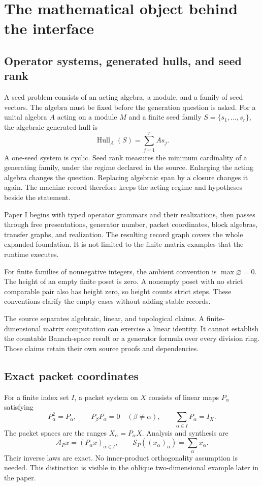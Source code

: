 \documentclass[a4paper,11pt]{article}
\newcommand{\Hull}{\operatorname{Hull}}\newcommand{\srank}{\operatorname{srank}}\newcommand{\psrank}{\operatorname{psrank}}\newcommand{\End}{\operatorname{End}}\newcommand{\Hom}{\operatorname{Hom}}\newcommand{\im}{\operatorname{im}}\newcommand{\Ker}{\operatorname{Ker}}\newcommand{\Jac}{\operatorname{Jac}}\newcommand{\Irr}{\operatorname{Irr}}\newcommand{\Span}{\operatorname{span}}\newcommand{\alg}{\operatorname{alg}}\newcommand{\Reach}{\operatorname{Reach}}\newcommand{\Supp}{\operatorname{Supp}}\newcommand{\id}{\mathrm{id}}\newcommand{\cl}[1]{\overline{#1}}
\begin{document}
\section{The mathematical object behind the interface}
\subsection{Operator systems, generated hulls, and seed rank}
A seed problem consists of an acting algebra, a module, and a family of seed vectors. The algebra must be fixed before the generation question is asked. For a unital algebra $A$ acting on a module $M$ and a finite seed family $S=\{s_1,\ldots,s_r\}$, the algebraic generated hull is
\[
\Hull_A(S)=\sum_{j=1}^{r}As_j.
\]
A one-seed system is cyclic. Seed rank measures the minimum cardinality of a generating family, under the regime declared in the source. Enlarging the acting algebra changes the question. Replacing algebraic span by a closure changes it again. The machine record therefore keeps the acting regime and hypotheses beside the statement.

Paper I begins with typed operator grammars and their realizations, then passes through free presentations, generator number, packet coordinates, block algebras, transfer graphs, and realization. The resulting record graph covers the whole expanded foundation. It is not limited to the finite matrix examples that the runtime executes.

For finite families of nonnegative integers, the ambient convention is $\max\varnothing=0$. The height of an empty finite poset is zero. A nonempty poset with no strict comparable pair also has height zero, so height counts strict steps. These conventions clarify the empty cases without adding stable records.

The source separates algebraic, linear, and topological claims. A finite-dimensional matrix computation can exercise a linear identity. It cannot establish the countable Banach-space result or a generator formula over every division ring. Those claims retain their own source proofs and dependencies.
\subsection{Exact packet coordinates}
For a finite index set $I$, a packet system on $X$ consists of linear maps $P_\alpha$ satisfying
\[
P_\alpha^2=P_\alpha,\qquad
P_\beta P_\alpha=0\quad(\beta\ne\alpha),\qquad
\sum_{\alpha\in I}P_\alpha=I_X.
\]
The packet spaces are the ranges $X_\alpha=P_\alpha X$. Analysis and synthesis are
\[
\mathcal A_Px=(P_\alpha x)_{\alpha\in I},\qquad
\mathcal S_P((x_\alpha)_\alpha)=\sum_\alpha x_\alpha.
\]
Their inverse laws are exact. No inner-product orthogonality assumption is needed. This distinction is visible in the oblique two-dimensional example later in the paper.
\end{document}
